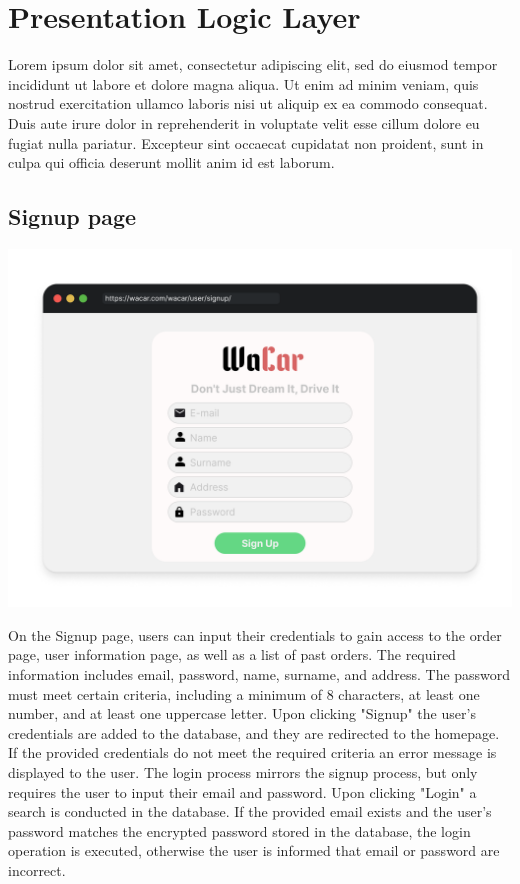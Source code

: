 \section{Presentation Logic Layer}


Lorem ipsum dolor sit amet, consectetur adipiscing elit, sed do eiusmod tempor incididunt ut labore et dolore magna aliqua. Ut enim ad minim veniam, quis nostrud exercitation ullamco laboris nisi ut aliquip ex ea commodo consequat. Duis aute irure dolor in reprehenderit in voluptate velit esse cillum dolore eu fugiat nulla pariatur. Excepteur sint occaecat cupidatat non proident, sunt in culpa qui officia deserunt mollit anim id est laborum.

\subsection{Signup page}

\begin{center}
	\includegraphics[scale=0.3]{./mockup/signUp.png}
	\label{ERSchema}
\end{center}


On the Signup page, users can input their credentials to gain access to the order page, user information page, as well as a list of past orders.
The required information includes email, password, name, surname, and address. The password must meet certain criteria, including a minimum of 8 characters, at least one number, and at least one uppercase letter. 
Upon clicking "Signup" the user's credentials are added to the database, and they are redirected to the homepage.
If the provided credentials do not meet the required criteria an error message is displayed to the user.
The login process mirrors the signup process, but only requires the user to input their email and password. Upon clicking "Login" a search is conducted in the database. 
If the provided email exists and the user's password matches the encrypted password stored in the database, the login operation is executed, otherwise the user is informed that email or password are incorrect.

